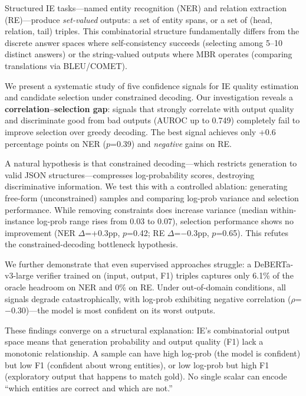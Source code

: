 \documentclass[11pt,a4paper]{article}
\begin{document}
Structured IE tasks---named entity recognition (NER) and relation extraction (RE)---produce \emph{set-valued} outputs: a set of entity spans, or a set of (head, relation, tail) triples. This combinatorial structure fundamentally differs from the discrete answer spaces where self-consistency succeeds (selecting among 5--10 distinct answers) or the string-valued outputs where MBR operates (comparing translations via BLEU/COMET).

We present a systematic study of five confidence signals for IE quality estimation and candidate selection under constrained decoding. Our investigation reveals a \textbf{correlation--selection gap}: signals that strongly correlate with output quality and discriminate good from bad outputs (AUROC up to 0.749) completely fail to improve selection over greedy decoding. The best signal achieves only +0.6 percentage points on NER ($p$=0.39) and \emph{negative} gains on RE.

A natural hypothesis is that constrained decoding---which restricts generation to valid JSON structures---compresses log-probability scores, destroying discriminative information. We test this with a controlled ablation: generating free-form (unconstrained) samples and comparing log-prob variance and selection performance. While removing constraints does increase variance (median within-instance log-prob range rises from 0.03 to 0.07), selection performance shows no improvement (NER $\Delta$=+0.3pp, $p$=0.42; RE $\Delta$=$-$0.3pp, $p$=0.65). This refutes the constrained-decoding bottleneck hypothesis.

We further demonstrate that even supervised approaches struggle: a DeBERTa-v3-large verifier trained on (input, output, F1) triples captures only 6.1\% of the oracle headroom on NER and 0\% on RE. Under out-of-domain conditions, all signals degrade catastrophically, with log-prob exhibiting negative correlation ($\rho$=$-$0.30)---the model is most confident on its worst outputs.

These findings converge on a structural explanation: IE's combinatorial output space means that generation probability and output quality (F1) lack a monotonic relationship. A sample can have high log-prob (the model is confident) but low F1 (confident about wrong entities), or low log-prob but high F1 (exploratory output that happens to match gold). No single scalar can encode ``which entities are correct and which are not.''
\end{document}
